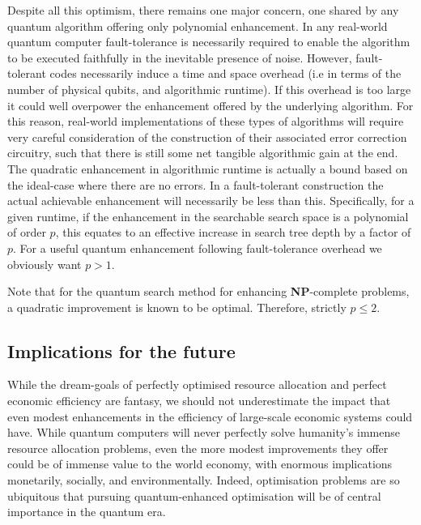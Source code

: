 Despite all this optimism, there remains one major concern, one shared by any quantum algorithm offering only polynomial enhancement. In any real-world quantum computer fault-tolerance is necessarily required to enable the algorithm to be executed faithfully in the inevitable presence of noise. However, fault-tolerant codes necessarily induce a time and space overhead (i.e in terms of the number of physical qubits, and algorithmic runtime). If this overhead is too large it could well overpower the   enhancement offered by the underlying algorithm. For this reason, real-world implementations of these types of algorithms will require very careful consideration of the construction of their associated error correction circuitry, such that there is still some net tangible algorithmic gain at the end. The quadratic enhancement in algorithmic runtime is actually a bound based on the ideal-case where there are no errors. In a fault-tolerant construction the actual achievable enhancement will necessarily be less than this. Specifically, for a given runtime, if the enhancement in the searchable search space is a polynomial of order $p$, this equates to an effective increase in search tree depth by a factor of $p$. For a useful quantum enhancement following fault-tolerance overhead we obviously want \mbox{$p>1$}.

Note that for the quantum search method for enhancing \textbf{NP}-complete problems, a quadratic improvement is known to be optimal. Therefore, strictly \mbox{$p\leq 2$}.

\subsection{Implications for the future}

While the dream-goals of perfectly optimised resource allocation and perfect economic efficiency are fantasy, we should not underestimate the impact that even modest enhancements in the efficiency of large-scale economic systems could have. While quantum computers will never perfectly solve humanity's immense resource allocation problems, even the more modest improvements they offer could be of immense value to the world economy, with enormous implications monetarily, socially, and environmentally. Indeed, optimisation problems are so ubiquitous that pursuing quantum-enhanced optimisation will be of central importance in the quantum era.
